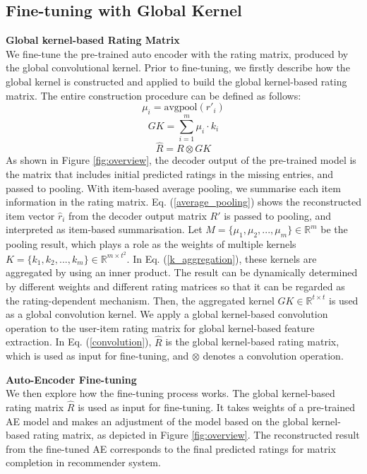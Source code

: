 \documentclass[sigconf]{acmart}
\begin{document}
\subsection{Fine-tuning with Global Kernel}
\textbf{Global kernel-based Rating Matrix}\\
We fine-tune the pre-trained auto encoder with the rating matrix, produced by the global convolutional kernel. Prior to fine-tuning, we firstly describe how the global kernel is constructed and applied to build the global kernel-based rating matrix. The entire construction procedure can be defined as follows:
\begin{equation}
    \label{average_pooling}
    \mu_i=\text{avgpool}({r}'_i)
\end{equation}
\begin{equation}
    \label{k_aggregation}
    GK=\sum_{i=1}^{m}\mu_{i}\cdot k_{i}
\end{equation}
\begin{equation}
    \label{convolution}
    \hat{R}=R\otimes GK
\end{equation}
As shown in Figure \ref{fig:overview}, the decoder output of the pre-trained model is the matrix that includes initial predicted ratings in the missing entries, and passed to pooling. With item-based average pooling, we summarise each item information in the rating matrix. Eq. (\ref{average_pooling}) shows the reconstructed item vector $\hat{r}_i$ from the decoder output matrix $R'$ is passed to pooling, and interpreted as item-based summarisation. Let $M=\{\mu_1, \mu_2, ..., \mu_m\} \in \mathbb{R}^{m}$ be the pooling result, which plays a role as the weights of multiple kernels $K = \{k_1, k_2, ..., k_m\} \in \mathbb{R}^{m \times t^2}$. In Eq. (\ref{k_aggregation}), these kernels are aggregated by using an inner product. The result can be dynamically determined by different weights and different rating matrices so that it can be regarded as the rating-dependent mechanism. Then, the aggregated kernel $GK \in \mathbb{R}^{t\times t}$ is used as a global convolution kernel. We apply a global kernel-based convolution operation to the user-item rating matrix for global kernel-based feature extraction. In Eq. (\ref{convolution}), $\hat{R}$ is the global kernel-based rating matrix, which is used as input for fine-tuning, and $\otimes$ denotes a convolution operation.

\medskip
\noindent\textbf{Auto-Encoder Fine-tuning}\\
We then explore how the fine-tuning process works. The global kernel-based rating matrix $\hat{R}$ is used as input for fine-tuning. It takes weights of a pre-trained AE model and makes an adjustment of the model based on the global kernel-based rating matrix, as depicted in Figure \ref{fig:overview}. The reconstructed result from the fine-tuned AE corresponds to the final predicted ratings for matrix completion in recommender system.
\end{document}
